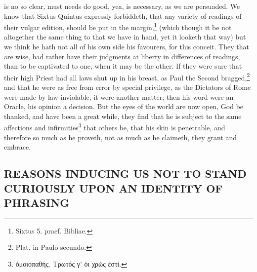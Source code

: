 is no so clear, must needs do good, yea, is necessary, as we are persuaded. We know that Sixtus Quintus expressly forbiddeth, that any variety of readings of their vulgar edition, should be put in the margin,\footnote{Sixtus 5. praef. Bibliae.} (which though it be not altogether the same thing to that we have in hand, yet it looketh that way) but we think he hath not all of his own side his favourers, for this conceit. They that are wise, had rather have their judgments at liberty in differences of readings, than to be captivated to one, when it may be the other. If they were sure that their high Priest had all laws shut up in his breast, as Paul the Second bragged,\footnote{Plat. in Paulo secundo.} and that he were as free from error by special privilege, as the Dictators of Rome were made by law inviolable, it were another matter; then his word were an Oracle, his opinion a decision. But the eyes of the world are now open, God be thanked, and have been a great while, they find that he is subject to the same affections and infirmities\footnote{\foreignlanguage{greek}{ὁμοιοπαθής. Τρωτός γ’ ὁι χρώς ἐστί.}} that others be, that his skin is penetrable, and therefore so much as he proveth, not as much as he claimeth, they grant and embrace.

\subsection{REASONS INDUCING US NOT TO STAND CURIOUSLY UPON AN IDENTITY OF PHRASING}

